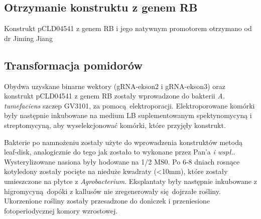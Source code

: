 \documentclass[two column, twoside, a4paper]{article}
\begin{document}
\subsection{Otrzymanie konstruktu z genem RB}

Konstrukt pCLD04541 z genem RB i jego natywnym promotorem otrzymano od dr Jiming Jiang\autocite{Song2003}

\subsection{Transformacja pomidorów}

Obydwa uzyskane binarne wektory (gRNA-ekson2 i gRNA-ekson3) oraz konstrukt pCLD04541 z genem RB zostały wprowadzone do bakterii \textit{A. tumefaciens} szczep GV3101, za pomocą elektroporacji. Elektroporowane komórki były następnie inkubowane na medium LB suplementowanym spektynomycyną i streptomycyną, aby wyselekcjonować komórki, które przyjęły konstrukt.

Bakterie po namnożeniu zostały użyte do wprowadzenia konstruktów metodą leaf-disk\autocite{McCormick1986}, analogicznie do tego jak zostało to wykonane przez Pan'a \textit{i wspł.}\autocite{Pan2016}. Wysterylizowane nasiona były hodowane na 1/2 MS0. Po 6-8 dniach rosnące kotyledony zostały pocięte na nieduże kwadraty (<10mm), które zostały umieszczone na płytce z \textit{Agrobacterium}. Eksplantaty były następnie inkubowane z higromycyną dopóki z kallusów nie zregenerowały się dojrzałe rośliny. Ukorzenione rośliny zostały przesadzone do doniczek i przeniesione fotoperiodycznej komory wzrostowej.
\end{document}
